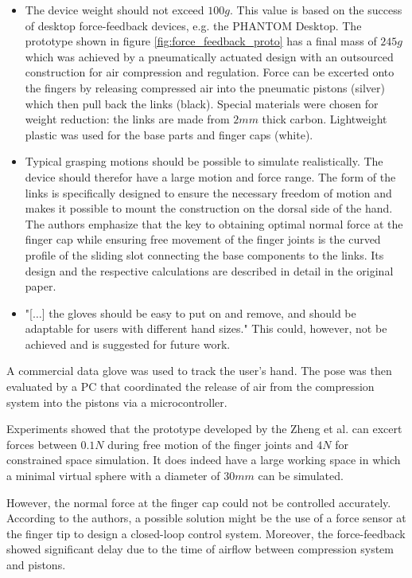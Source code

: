 \documentclass[hyperref, bachelorofscience]{cgvpub}
\begin{document}
\begin{itemize}
	\item The device weight should not exceed $ 100g $. This value is based on the success of desktop force-feedback devices, e.g. the PHANTOM Desktop. The prototype shown in figure \ref{fig:force_feedback_proto} has a final mass of $ 245g $ which was achieved by a pneumatically actuated design with an outsourced construction for air compression and regulation. Force can be excerted onto the fingers by releasing compressed air into the pneumatic pistons (silver) which then pull back the links (black). Special materials were chosen for weight reduction: the links are made from $ 2mm $ thick carbon. Lightweight plastic was used for the base parts and finger caps (white).
	\item Typical grasping motions should be possible to simulate realistically. The device should therefor have a large motion and force range. The form of the links is specifically designed to ensure the necessary freedom of motion and makes it possible to mount the construction on the dorsal side of the hand. The authors emphasize that the key to obtaining optimal normal force at the finger cap while ensuring free movement of the finger joints is the curved profile of the sliding slot connecting the base components to the links. Its design and the respective calculations are described in detail in the original paper.
	\item "[$\dots$] the gloves should be easy to put on and remove, and should be adaptable for users with different hand sizes." This could, however, not be achieved and is suggested for future work.
\end{itemize}

A commercial data glove was used to track the user's hand. The pose was then evaluated by a PC that coordinated the release of air from the compression system into the pistons via a microcontroller. 

Experiments showed that the prototype developed by the Zheng et al. can excert forces between $ 0.1N $ during free motion of the finger joints and $ 4N $ for constrained space simulation. It does indeed have a large working space in which a minimal virtual sphere with a diameter of $ 30mm $ can be simulated.

However, the normal force at the finger cap could not be controlled accurately. According to the authors, a possible solution might be the use of a force sensor at the finger tip to design a closed-loop control system. Moreover, the force-feedback showed significant delay due to the time of airflow between compression system and pistons.
\end{document}
